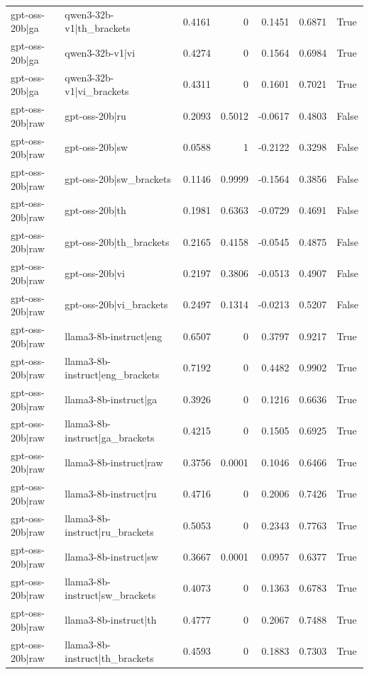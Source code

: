 \begin{table}
\begin{tabular}{l l r r r r l}
gpt-oss-20b|ga & qwen3-32b-v1|th_brackets & 0.4161 & 0 & 0.1451 & 0.6871 & True \\
gpt-oss-20b|ga & qwen3-32b-v1|vi & 0.4274 & 0 & 0.1564 & 0.6984 & True \\
gpt-oss-20b|ga & qwen3-32b-v1|vi_brackets & 0.4311 & 0 & 0.1601 & 0.7021 & True \\
gpt-oss-20b|raw & gpt-oss-20b|ru & 0.2093 & 0.5012 & -0.0617 & 0.4803 & False \\
gpt-oss-20b|raw & gpt-oss-20b|sw & 0.0588 & 1 & -0.2122 & 0.3298 & False \\
gpt-oss-20b|raw & gpt-oss-20b|sw_brackets & 0.1146 & 0.9999 & -0.1564 & 0.3856 & False \\
gpt-oss-20b|raw & gpt-oss-20b|th & 0.1981 & 0.6363 & -0.0729 & 0.4691 & False \\
gpt-oss-20b|raw & gpt-oss-20b|th_brackets & 0.2165 & 0.4158 & -0.0545 & 0.4875 & False \\
gpt-oss-20b|raw & gpt-oss-20b|vi & 0.2197 & 0.3806 & -0.0513 & 0.4907 & False \\
gpt-oss-20b|raw & gpt-oss-20b|vi_brackets & 0.2497 & 0.1314 & -0.0213 & 0.5207 & False \\
gpt-oss-20b|raw & llama3-8b-instruct|eng & 0.6507 & 0 & 0.3797 & 0.9217 & True \\
gpt-oss-20b|raw & llama3-8b-instruct|eng_brackets & 0.7192 & 0 & 0.4482 & 0.9902 & True \\
gpt-oss-20b|raw & llama3-8b-instruct|ga & 0.3926 & 0 & 0.1216 & 0.6636 & True \\
gpt-oss-20b|raw & llama3-8b-instruct|ga_brackets & 0.4215 & 0 & 0.1505 & 0.6925 & True \\
gpt-oss-20b|raw & llama3-8b-instruct|raw & 0.3756 & 0.0001 & 0.1046 & 0.6466 & True \\
gpt-oss-20b|raw & llama3-8b-instruct|ru & 0.4716 & 0 & 0.2006 & 0.7426 & True \\
gpt-oss-20b|raw & llama3-8b-instruct|ru_brackets & 0.5053 & 0 & 0.2343 & 0.7763 & True \\
gpt-oss-20b|raw & llama3-8b-instruct|sw & 0.3667 & 0.0001 & 0.0957 & 0.6377 & True \\
gpt-oss-20b|raw & llama3-8b-instruct|sw_brackets & 0.4073 & 0 & 0.1363 & 0.6783 & True \\
gpt-oss-20b|raw & llama3-8b-instruct|th & 0.4777 & 0 & 0.2067 & 0.7488 & True \\
gpt-oss-20b|raw & llama3-8b-instruct|th_brackets & 0.4593 & 0 & 0.1883 & 0.7303 & True \\

\end{tabular}
\end{table}
